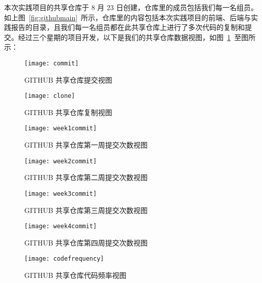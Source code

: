 本次实践项目的共享仓库于 8 月 23 日创建，仓库里的成员包括我们每一名组员。如上图~\ref{fig:githubmain}~所示，仓库里的内容包括本次实践项目的前端、后端与实践报告的目录，且我们每一名组员都在此共享仓库上进行了多次代码的复制和提交。经过三个星期的项目开发，以下是我们的共享仓库数据视图，如图~\ref{fig:commit}~至图所示：

\begin{figure}[htbp]
    \centering
    \texttt{[image: commit]}
    \caption{GITHUB 共享仓库提交视图}\label{fig:commit}
    \vspace{\baselineskip}
\end{figure}
\begin{figure}[htbp]
    \centering
    \texttt{[image: clone]}
    \caption{GITHUB 共享仓库复制视图}\label{fig:clone}
    \vspace{\baselineskip}
\end{figure}
\begin{figure}[htbp]
    \centering
    \texttt{[image: week1commit]}
    \caption{GITHUB 共享仓库第一周提交次数视图}\label{fig:week1commit}
    \vspace{\baselineskip}
\end{figure}
\begin{figure}[htbp]
    \centering
    \texttt{[image: week2commit]}
    \caption{GITHUB 共享仓库第二周提交次数视图}\label{fig:week2commit}
    \vspace{\baselineskip}
\end{figure}
\begin{figure}[htbp]
    \centering
    \texttt{[image: week3commit]}
    \caption{GITHUB 共享仓库第三周提交次数视图}\label{fig:week3commit}
    \vspace{\baselineskip}
\end{figure}
\begin{figure}[htbp]
    \centering
    \texttt{[image: week4commit]}
    \caption{GITHUB 共享仓库第四周提交次数视图}\label{fig:week4commit}
    \vspace{\baselineskip}
\end{figure}
\begin{figure}[htbp]
    \centering
    \texttt{[image: codefrequency]}
    \caption{GITHUB 共享仓库代码频率视图}\label{fig:codefrequency}
    \vspace{\baselineskip}
\end{figure}

